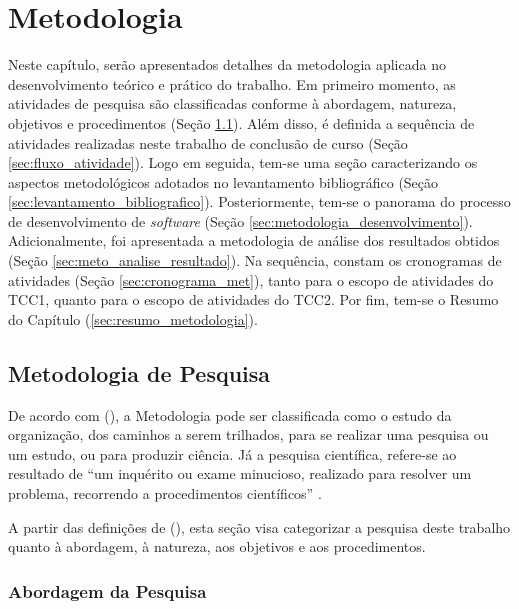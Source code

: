 \chapter[Metodologia]{Metodologia}

\label{chap:metodologia}

Neste capítulo, serão apresentados detalhes da metodologia aplicada no desenvolvimento teórico e prático do trabalho. Em primeiro momento, as atividades de pesquisa são classificadas conforme à abordagem, natureza, objetivos e procedimentos (Seção \ref{sec:met_pesquisa}). Além disso, é definida a sequência de atividades realizadas neste trabalho de conclusão de curso (Seção \ref{sec:fluxo_atividade}). Logo em seguida, tem-se uma seção caracterizando os aspectos metodológicos adotados no levantamento bibliográfico (Seção \ref{sec:levantamento_bibliografico}). Posteriormente, tem-se o panorama do processo de desenvolvimento de \textit{software} (Seção \ref{sec:metodologia_desenvolvimento}). Adicionalmente, foi apresentada a metodologia de análise dos resultados obtidos (Seção \ref{sec:meto_analise_resultado}). Na sequência, constam os cronogramas de atividades (Seção \ref{sec:cronograma_met}), tanto para o escopo de atividades do TCC1, quanto para o escopo de atividades do TCC2. Por fim, tem-se o Resumo do Capítulo (\ref{sec:resumo_metodologia}).

\section{Metodologia de Pesquisa}
\label{sec:met_pesquisa}
De acordo com  (\citeyear{gerhardt2009metodos}), a Metodologia pode ser classificada como o estudo da organização, dos caminhos a serem trilhados, para se realizar uma pesquisa ou um estudo, ou para produzir ciência. Já a pesquisa científica, refere-se ao resultado de “um inquérito ou exame minucioso, realizado para resolver um problema, recorrendo a procedimentos científicos” \cite{gerhardt2009metodos}.

A partir das definições de  (\citeyear{gerhardt2009metodos}), esta seção visa categorizar a pesquisa deste trabalho quanto à abordagem, à natureza, aos objetivos e aos procedimentos.

\subsection{Abordagem da Pesquisa}

